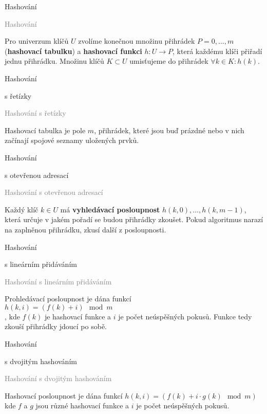 \documentclass[20pt]{extarticle}
\newcommand{\card}[3][]{
	\vspace*{\fill}

	\newpage
	\topskip0pt
	\vspace*{\fill}
		\Large #2

		\vspace{1cm}
		\normalsize #1
	\vspace*{\fill}
	\newpage

	\small \textcolor{gray}{#2 #1}
	\topskip0pt
	\vspace*{\fill}

	\normalsize
	#3
	\vspace*{\fill}
}
\begin{document}
\begin{center}
\card{Hashování}{
	Pro univerzum klíčů $U$ zvolíme konečnou množinu přihrádek $P={0, \dots, m}$
	(\textbf{hashovací tabulku}) a \textbf{hashovací funkci} $h: U \to P$, která
	každému klíči přiřadí jednu přihrádku. Množinu klíčů $K \subset U$ umisťujeme
	do přihrádek $\forall k \in K: h(k)$.
}

\card[s řetízky]{Hashování}{
	Hashovací tabulka je pole $m$, přihrádek, které jsou buď prázdné nebo v nich
	začínají spojové seznamy uložených prvků.
}

\card[s otevřenou adresací]{Hashování}{
	Každý klíč $k \in U$ má \textbf{vyhledávací posloupnost} $h(k, 0), \dots, h(k, m-1)$,
	která určuje v jakém pořadí se budou přihrádky zkoušet. Pokud algoritmus narazí
	na zaplněnou přihrádku, zkusí další z posloupnosti.
}

\card[s lineárním přidáváním]{Hashování}{
	Prohledávací posloupnost je dána funkcí\\
	$h(k, i) = (f(k) + i) \mod m$\\, kde
	$f(k)$ je hashovací funkce a $i$ je počet neúspěšných pokusů. Funkce tedy zkouší
	přihrádky jdoucí po sobě.
}

\card[s dvojitým hashováním]{Hashování}{
	Hashovací posloupnost je dána funkcí $h(k, i) = (f(k) + i \cdot g(k) \mod m)$
	kde $f$ a $g$ jsou různé hashovací funkce a $i$ je počet neúspěšných pokusů.
}

\end{center}
\end{document}
